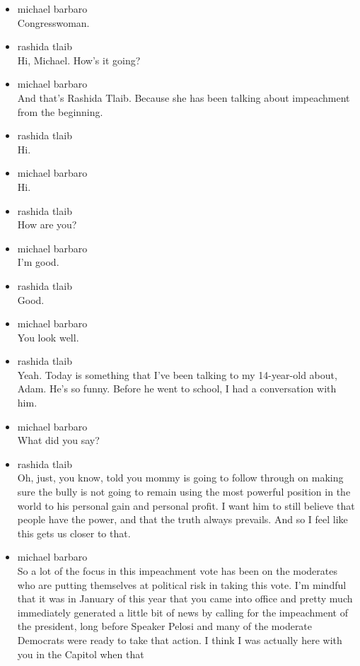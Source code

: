 \begin{itemize}
\item
  michael barbaro\\
  Congresswoman.
\item
  rashida tlaib\\
  Hi, Michael. How's it going?
\item
  michael barbaro\\
  And that's Rashida Tlaib. Because she has been talking about
  impeachment from the beginning.
\item
  rashida tlaib\\
  Hi.
\item
  michael barbaro\\
  Hi.
\item
  rashida tlaib\\
  How are you?
\item
  michael barbaro\\
  I'm good.
\item
  rashida tlaib\\
  Good.
\item
  michael barbaro\\
  You look well.
\item
  rashida tlaib\\
  Yeah. Today is something that I've been talking to my 14-year-old
  about, Adam. He's so funny. Before he went to school, I had a
  conversation with him.
\item
  michael barbaro\\
  What did you say?
\item
  rashida tlaib\\
  Oh, just, you know, told you mommy is going to follow through on
  making sure the bully is not going to remain using the most powerful
  position in the world to his personal gain and personal profit. I want
  him to still believe that people have the power, and that the truth
  always prevails. And so I feel like this gets us closer to that.
\item
  michael barbaro\\
  So a lot of the focus in this impeachment vote has been on the
  moderates who are putting themselves at political risk in taking this
  vote. I'm mindful that it was in January of this year that you came
  into office and pretty much immediately generated a little bit of news
  by calling for the impeachment of the president, long before Speaker
  Pelosi and many of the moderate Democrats were ready to take that
  action. I think I was actually here with you in the Capitol when that

\end{itemize}
